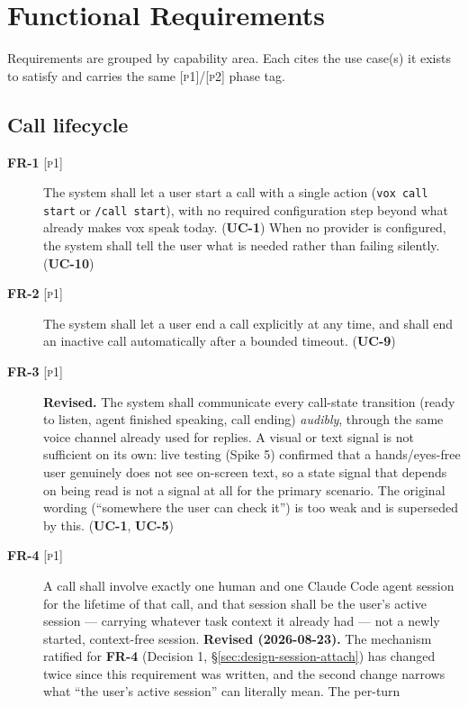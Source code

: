 \documentclass[a4paper,11pt]{report}
\newcommand{\uc}[1]{\textbf{UC-#1}}
\newcommand{\fr}[1]{\textbf{FR-#1}}
\newcommand{\pone}{\textsc{[p1]}}
\newcommand{\ptwo}{\textsc{[p2]}}
\begin{document}
\section{Functional Requirements}
\label{sec:fr}

Requirements are grouped by capability area. Each cites the use case(s) it
exists to satisfy and carries the same \pone{}/\ptwo{} phase tag.

\subsection{Call lifecycle}

\begin{description}
  \item[\fr{1} \pone{}] The system shall let a user start a call with a
    single action (\texttt{vox call start} or \texttt{/call start}), with
    no required configuration step beyond what already makes vox speak
    today. (\uc{1}) When no provider is configured, the system shall tell
    the user what is needed
    rather than failing silently. (\uc{10})
  \item[\fr{2} \pone{}] The system shall let a user end a call explicitly
    at any time, and shall end an inactive call automatically after a
    bounded timeout. (\uc{9})
  \item[\fr{3} \pone{}] \textbf{Revised.} The system shall communicate
    every call-state transition (ready to listen, agent finished
    speaking, call ending) \emph{audibly}, through the same voice channel
    already used for replies. A visual or text signal is not sufficient
    on its own: live testing (Spike 5) confirmed that a hands/eyes-free
    user genuinely does not see on-screen text, so a state signal that
    depends on being read is not a signal at all for the primary
    scenario. The original wording (``somewhere the user can check it'')
    is too weak and is superseded by this. (\uc{1}, \uc{5})
  \item[\fr{4} \pone{}] A call shall involve exactly one human and one
    Claude Code agent session for the lifetime of that call, and that
    session shall be the user's active session --- carrying whatever task
    context it already had --- not a newly started, context-free session.
    \textbf{Revised (2026-08-23).} The mechanism ratified for \fr{4}
    (Decision 1, \S\ref{sec:design-session-attach}) has changed twice
    since this requirement was written, and the second change narrows
    what ``the user's active session'' can literally mean. The per-turn

\end{description}
\end{document}
